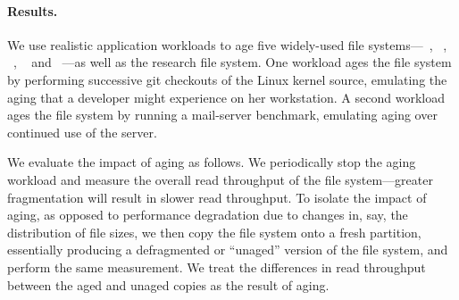 \paragraph{Results.} We use realistic application workloads to age five
widely-used file systems---\btrfs~\cite{DBLP:journals/tos/RodehBM13},
\ext~\cite{ext2, ext3, DBLP:journals/usenix-login/MathurCD07},
\ftwofs~\cite{DBLP:conf/fast/LeeSHC15}, \xfs~\cite{DBLP:conf/usenix/Sweeney96}
and \zfs~\cite{DBLP:conf/lisa/Bonwick07a}---as well as the \betrfs research
file system.  One workload ages the file system by performing successive git
checkouts of the Linux kernel source, emulating the aging that a developer
might experience on her workstation.  A second workload ages the file system by
running a mail-server benchmark, emulating aging over continued use of the
server.

We evaluate the impact of aging as follows.  We periodically stop the
aging workload and measure the overall read throughput of the file
system---greater fragmentation will result in slower read throughput.
To isolate the impact of aging, as opposed to performance degradation due
to changes in, say, the distribution of file sizes, we then copy the
file system onto a fresh partition, essentially producing a
defragmented or ``unaged'' version of the file system, and perform the
same measurement.  We treat the differences in read throughput
between the aged and unaged copies as the result of aging.  

